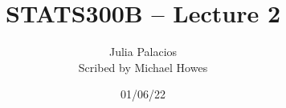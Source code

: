 




\title{STATS300B -- Lecture 2}
\author{Julia Palacios\\ Scribed by Michael Howes}
\date{01/06/22}

\pagestyle{fancy}
\fancyhf{}


\maketitle
\tableofcontents

